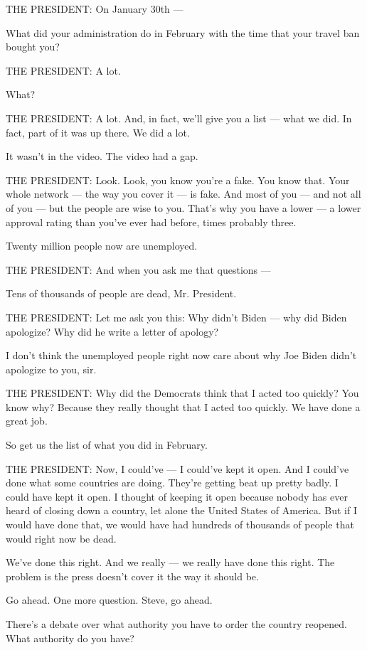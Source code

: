 THE PRESIDENT: On January 30th ---

What did your administration do in February with the time that your
travel ban bought you?

THE PRESIDENT: A lot.

What?

THE PRESIDENT: A lot. And, in fact, we'll give you a list --- what we
did. In fact, part of it was up there. We did a lot.

It wasn't in the video. The video had a gap.

THE PRESIDENT: Look. Look, you know you're a fake. You know that. Your
whole network --- the way you cover it --- is fake. And most of you ---
and not all of you --- but the people are wise to you. That's why you
have a lower --- a lower approval rating than you've ever had before,
times probably three.

Twenty million people now are unemployed.

THE PRESIDENT: And when you ask me that questions ---

Tens of thousands of people are dead, Mr. President.

THE PRESIDENT: Let me ask you this: Why didn't Biden --- why did Biden
apologize? Why did he write a letter of apology?

I don't think the unemployed people right now care about why Joe Biden
didn't apologize to you, sir.

THE PRESIDENT: Why did the Democrats think that I acted too quickly? You
know why? Because they really thought that I acted too quickly. We have
done a great job.

So get us the list of what you did in February.

THE PRESIDENT: Now, I could've --- I could've kept it open. And I
could've done what some countries are doing. They're getting beat up
pretty badly. I could have kept it open. I thought of keeping it open
because nobody has ever heard of closing down a country, let alone the
United States of America. But if I would have done that, we would have
had hundreds of thousands of people that would right now be dead.

We've done this right. And we really --- we really have done this right.
The problem is the press doesn't cover it the way it should be.

Go ahead. One more question. Steve, go ahead.

There's a debate over what authority you have to order the country
reopened. What authority do you have?

